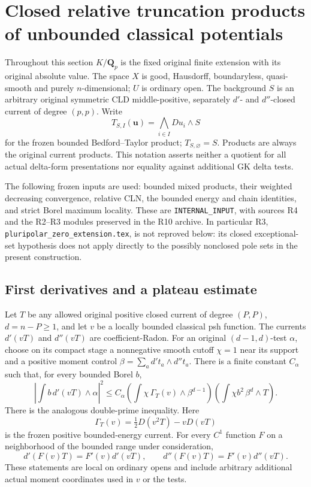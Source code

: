 \section{Closed relative truncation products of unbounded classical potentials}
\label{sec:r11-relative-truncation}

Throughout this section $K/\mathbf Q_p$ is the fixed original finite
extension with its original absolute value.  The space $X$ is good,
Hausdorff, boundaryless, quasi-smooth and purely $n$-dimensional; $U$ is
ordinary open.  The background $S$ is an arbitrary original symmetric
CLD middle-positive, separately $d'$- and $d''$-closed current of
degree $(p,p)$.  Write
\[
 T_{S,I}(\mathbf u)=\bigwedge_{i\in I}D u_i\wedge S
\]
for the frozen bounded Bedford--Taylor product; $T_{S,\varnothing}=S$.
Products are always the original current products.  This notation
asserts neither a quotient for all actual delta-form presentations nor
equality against additional GK delta tests.

The following frozen inputs are used: bounded mixed products, their
weighted decreasing convergence, relative CLN, the bounded energy and
chain identities, and strict Borel maximum locality.  These are
\texttt{INTERNAL\_INPUT}, with sources R4 and the R2--R3 modules
preserved in the R10 archive.  In particular R3,
\texttt{pluripolar\_zero\_extension.tex}, is not reproved below: its
closed exceptional-set hypothesis does not apply directly to the
possibly nonclosed pole sets in the present construction.

\subsection{First derivatives and a plateau estimate}

\begin{lemma}
\label{lem:r11-bounded-first-order}
Let $T$ be any allowed original positive closed current of degree
$(P,P)$, $d=n-P\geq1$, and let $v$ be a locally bounded classical
psh function.  The currents $d'(vT)$ and $d''(vT)$ are coefficient-Radon.
For an original $(d-1,d)$-test $\alpha$, choose on its compact stage a
nonnegative smooth cutoff $\chi=1$ near its support and a positive
moment control $\beta=\sum_a d't_a\wedge d''t_a$.  There is a finite
constant $C_\alpha$ such that, for every bounded Borel $b$,
\[
 \left|\int b\,d'(vT)\wedge\alpha\right|^2
 \leq C_\alpha
 \left(\int\chi\,\Gamma_T(v)\wedge\beta^{d-1}\right)
 \left(\int\chi b^2\,\beta^d\wedge T\right).
 \tag{NP1}
\]
There is the analogous double-prime inequality.  Here
\[
 \Gamma_T(v)=\tfrac12D(v^2T)-vD(vT)
\]
is the frozen positive bounded-energy current.  For every $C^1$
function $F$ on a neighborhood of the bounded range under consideration,
\[
 d'(F(v)T)=F'(v)d'(vT),\qquad
 d''(F(v)T)=F'(v)d''(vT).
 \tag{NP2}
\]
These statements are local on ordinary opens and include arbitrary
additional actual moment coordinates used in $v$ or the tests.
\end{lemma}

